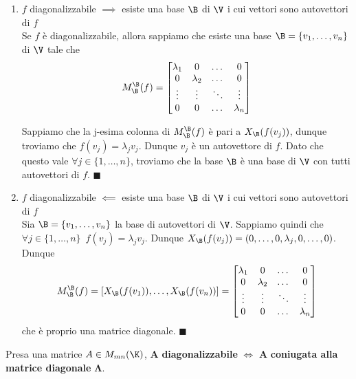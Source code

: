 \documentclass[11pt, a4paper, titlepage, oneside]{scrbook}
\begin{document}
\begin{enumerate}[label=\arabic*°]
    \item $f$ diagonalizzabile $\implies$ esiste una base $\B$ di $\V$ i cui vettori sono autovettori di $f$ \\
    Se $f$ è diagonalizzabile, allora sappiamo che esiste una base $\B = \{v_1, \ldots, v_n\}$ di $\V$ tale che 
    \[
    M_\B^\B(f) = \begin{bmatrix}
        \lambda_1 & 0 & \dots & 0 \\
        0 & \lambda_2 & \dots & 0 \\
        \vdots & \vdots & \ddots & \vdots \\
        0 & 0 & \dots & \lambda_n
    \end{bmatrix}
    \]

    Sappiamo che la j-esima colonna di $M_\B^\B(f)$ è pari a $X_\B(f(v_j))$, dunque troviamo che $f(v_j) = \lambda_j v_j$. Dunque $v_j$ è un autovettore di $f$. Dato che questo vale $\forall j \in \{1, \ldots, n\}$, troviamo che la base $\B$ è una base di $\V$ con tutti autovettori di $f$. $\blacksquare$
    \item $f$ diagonalizzabile $\impliedby$ esiste una base $\B$ di $\V$ i cui vettori sono autovettori di $f$ \\
    Sia $\B = \{v_1, \ldots, v_n\}$ la base di autovettori di $\V$. Sappiamo quindi che $\forall j \in \{1, \ldots, n\} \enspace f(v_j) = \lambda_j v_j$. Dunque $X_\B(f(v_j)) = (0,\ldots,0,\lambda_j,0,\ldots,0)$. Dunque
    \[
    M_\B^\B(f) = [X_\B(f(v_1)), \ldots, X_\B(f(v_n))] = \begin{bmatrix}
        \lambda_1 & 0 & \dots & 0 \\
        0 & \lambda_2 & \dots & 0 \\
        \vdots & \vdots & \ddots & \vdots \\
        0 & 0 & \dots & \lambda_n
    \end{bmatrix}
    \] 
    che è proprio una matrice diagonale. $\blacksquare$
\end{enumerate}

\begin{Proposizione}[]
\label{propos-matrice-diag-matrice-coniugata-diagonale}
Presa una matrice $A \in M_{mn}(\K)$, $\bm{A}$ \textbf{diagonalizzabile} $\iff$ $\bm{A}$ \textbf{coniugata alla matrice diagonale} $\bm{\Lambda}$.
\end{Proposizione}

\Dimostrazione \nopagebreak
\end{document}
